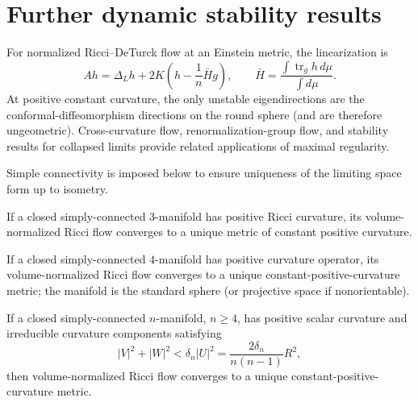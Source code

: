 \section{Further dynamic stability results}

For normalized Ricci--DeTurck flow at an Einstein metric, the linearization is
\begin{equation*}
 Ah=\Delta_Lh+2K\left(h-\frac1n\bar H g\right),
 \qquad \bar H=\frac{\int\operatorname{tr}_gh\,d\mu}{\int d\mu}.
 \tag{35.26}
\end{equation*}
At positive constant curvature, the only unstable eigendirections are the
conformal-diffeomorphism directions on the round sphere (and are therefore
ungeometric).  Cross-curvature flow, renormalization-group flow, and stability
results for collapsed limits provide related applications of maximal regularity.

\begin{remark}
\label{rem:chow-iv-positive-curvature-stability}
Simple connectivity is imposed below to ensure uniqueness of the limiting
space form up to isometry.
\end{remark}

\begin{theorem}
\label{thm:chow-iv-hamilton-positive-ricci}
If a closed simply-connected $3$-manifold has positive Ricci curvature, its
volume-normalized Ricci flow converges to a unique metric of constant positive
curvature.
\end{theorem}

\begin{theorem}
\label{thm:chow-iv-hamilton-positive-curvature-operator}
If a closed simply-connected $4$-manifold has positive curvature operator, its
volume-normalized Ricci flow converges to a unique constant-positive-curvature
metric; the manifold is the standard sphere (or projective space if
nonorientable).
\end{theorem}

\begin{theorem}
\label{thm:chow-iv-huisken-pinching}
If a closed simply-connected $n$-manifold, $n\ge4$, has positive scalar
curvature and irreducible curvature components satisfying
\[
 |V|^2+|W|^2<\delta_n|U|^2=\frac{2\delta_n}{n(n-1)}R^2,
\]
then volume-normalized Ricci flow converges to a unique constant-positive-
curvature metric.
\end{theorem}

